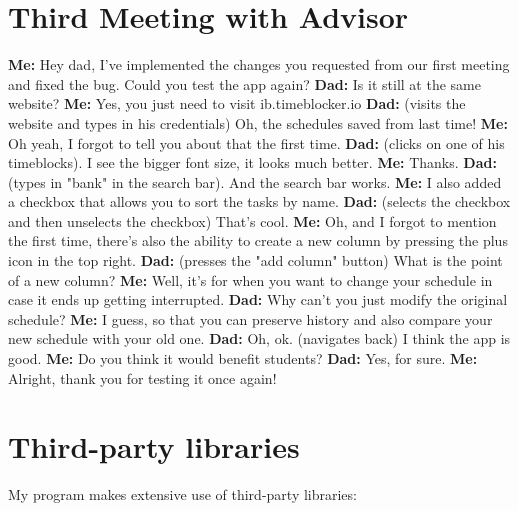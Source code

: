 \documentclass[12pt]{report}
\begin{document}
\section*{Third Meeting with Advisor}
\textbf{Me:} Hey dad, I've implemented the changes you requested from our first meeting and fixed the bug. Could you test the app again?
\textbf{Dad:} Is it still at the same website?
\textbf{Me:} Yes, you just need to visit ib.timeblocker.io
\textbf{Dad:} (visits the website and types in his credentials) Oh, the schedules saved from last time!
\textbf{Me:} Oh yeah, I forgot to tell you about that the first time.
\textbf{Dad:} (clicks on one of his timeblocks). I see the bigger font size, it looks much better.
\textbf{Me:} Thanks.
\textbf{Dad:} (types in "bank" in the search bar). And the search bar works.
\textbf{Me:} I also added a checkbox that allows you to sort the tasks by name.
\textbf{Dad:} (selects the checkbox and then unselects the checkbox) That's cool.
\textbf{Me:} Oh, and I forgot to mention the first time, there's also the ability to create a new column by pressing the plus icon in the top right.
\textbf{Dad:} (presses the "add column" button) What is the point of a new column?
\textbf{Me:} Well, it's for when you want to change your schedule in case it ends up getting interrupted.
\textbf{Dad:} Why can't you just modify the original schedule?
\textbf{Me:} I guess, so that you can preserve history and also compare your new schedule with your old one.
\textbf{Dad:} Oh, ok. (navigates back) I think the app is good.
\textbf{Me:} Do you think it would benefit students?
\textbf{Dad:} Yes, for sure.
\textbf{Me:} Alright, thank you for testing it once again!
\egroup


\section*{Third-party libraries}
My program makes extensive use of third-party libraries:
\end{document}
